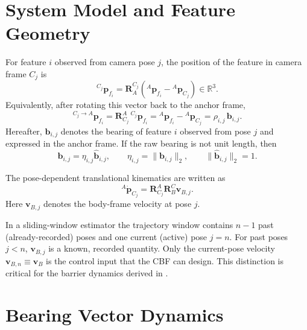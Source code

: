 \documentclass[11pt,a4paper]{article}
\newcommand{\R}{\mathbb{R}}
\begin{document}
\section{System Model and Feature Geometry}

For feature $i$ observed from camera pose $j$, the position of the feature in
camera frame $C_j$ is
\begin{equation}
  {}^{C_j}\bm{p}_{f_i}
  = \bm{R}_{A}^{C_j}\left({}^{A}\bm{p}_{f_i}
  - {}^{A}\bm{p}_{C_j}\right)
  \in\R^3 .
  \label{eq:feature_camera_frame}
\end{equation}
Equivalently, after rotating this vector back to the anchor frame,
\begin{equation}
  {}^{C_j\to A}\bm{p}_{f_i}
  = \bm{R}_{C_j}^{A}\,{}^{C_j}\bm{p}_{f_i}
  = {}^{A}\bm{p}_{f_i}-{}^{A}\bm{p}_{C_j}
  = \rho_{i,j}\,\bm{b}_{i,j}.
  \label{eq:feature_anchor_factored}
\end{equation}
Hereafter, $\bm{b}_{i,j}$ denotes the bearing of feature $i$ observed from pose
$j$ and expressed in the anchor frame.  If the raw bearing is not unit length,
then
\begin{equation}
  \bm{b}_{i,j}=\eta_{i,j}\hat{\bm{b}}_{i,j},
  \qquad
  \eta_{i,j}=\|\bm{b}_{i,j}\|_2,
  \qquad
  \|\hat{\bm{b}}_{i,j}\|_2=1 .
\end{equation}

The pose-dependent translational kinematics are written as
\begin{equation}
  {}^{A}\dot{\bm{p}}_{C_j}
  = \bm{R}_{C_j}^{A}\bm{R}_{B}^{C}\bm{v}_{B,j}.
  \label{eq:pose_velocity}
\end{equation}
Here $\bm{v}_{B,j}$ denotes the body-frame velocity at pose $j$.

\begin{remark}
In a sliding-window estimator the trajectory window contains $n-1$ past
(already-recorded) poses and one current (active) pose $j=n$.  For past poses
$j<n$, $\bm{v}_{B,j}$ is a known, recorded quantity.  Only the current-pose
velocity $\bm{v}_{B,n}\equiv\bm{v}_{B}$ is the control input that the CBF can
design.  This distinction is critical for the barrier dynamics derived in
.
\end{remark}

\section{Bearing Vector Dynamics}
\end{document}
